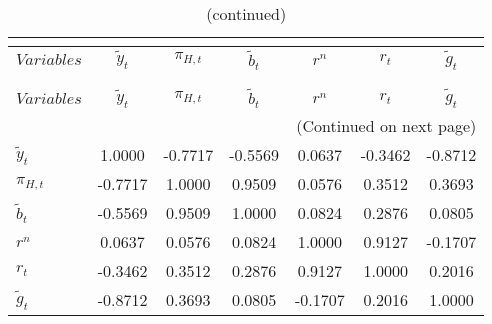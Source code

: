  
\begin{center}
\begin{longtable}{lcccccc} 
\caption{MATRIX OF CORRELATIONS}\\
 \label{Table:th_corr_matrix}\\
\toprule 
$Variables        $	 & 	 $   {\tilde{y}_{t}}$	 & 	 $       {\pi_{H,t}}$	 & 	 $     \tilde{b}_{t}$	 & 	 $            {r^{n}}$	 & 	 $            {r_{t}}$	 & 	 $     \tilde{g}_{t}$\\
\midrule \endfirsthead 
\caption{(continued)}\\
 \toprule \\ 
$Variables        $	 & 	 $   {\tilde{y}_{t}}$	 & 	 $       {\pi_{H,t}}$	 & 	 $     \tilde{b}_{t}$	 & 	 $            {r^{n}}$	 & 	 $            {r_{t}}$	 & 	 $     \tilde{g}_{t}$\\
\midrule \endhead 
\midrule \multicolumn{7}{r}{(Continued on next page)} \\ \bottomrule \endfoot 
\bottomrule \endlastfoot 
${\tilde{y}_{t}}  $	 & 	             1.0000	 & 	            -0.7717	 & 	            -0.5569	 & 	             0.0637	 & 	            -0.3462	 & 	            -0.8712 \\ 
${\pi_{H,t}}      $	 & 	            -0.7717	 & 	             1.0000	 & 	             0.9509	 & 	             0.0576	 & 	             0.3512	 & 	             0.3693 \\ 
$\tilde{b}_{t}    $	 & 	            -0.5569	 & 	             0.9509	 & 	             1.0000	 & 	             0.0824	 & 	             0.2876	 & 	             0.0805 \\ 
${r^{n}}          $	 & 	             0.0637	 & 	             0.0576	 & 	             0.0824	 & 	             1.0000	 & 	             0.9127	 & 	            -0.1707 \\ 
${r_{t}}          $	 & 	            -0.3462	 & 	             0.3512	 & 	             0.2876	 & 	             0.9127	 & 	             1.0000	 & 	             0.2016 \\ 
$\tilde{g}_{t}    $	 & 	            -0.8712	 & 	             0.3693	 & 	             0.0805	 & 	            -0.1707	 & 	             0.2016	 & 	             1.0000 \\ 
\end{longtable}
 \end{center}

